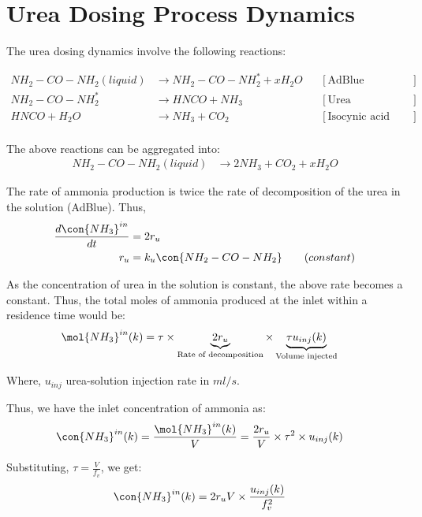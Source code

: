 \newpage
\section{Urea Dosing Process Dynamics}
The urea dosing dynamics involve the following reactions:

\begin{align*}
    NH_2 - CO - NH_2 (liquid) &\longrightarrow NH_2 - CO - NH_2^* + x H_2 O
                & &[\text{AdBlue evaporation}] \\
    NH_2 - CO - NH_2^*  &\longrightarrow  HNCO + NH_3
                & &[\text{Urea decomposition}] \\
    HNCO + H_2O &\longrightarrow NH_3 + CO_2
                & &[\text{Isocynic acid hydrolysis}] \\
\end{align*}

The above reactions can be aggregated into:
\begin{align*}
    NH_2 - CO - NH_2 (liquid) &\longrightarrow 2 NH_3 + CO_2 + x H_2 O
\end{align*}

The rate of ammonia production is twice the rate of decomposition of the urea in
the solution (AdBlue). Thus,
\begin{align*}
    \frac{d \con{NH_3}^{in}}{dt} &= 2 r_{u}\\
    r_{u} &= k_{u} \con{NH_2 - CO - NH_2} \qquad (constant)
\end{align*}

As the concentration of urea in the solution is constant, the above rate becomes
a constant. Thus, the total moles of ammonia produced at the inlet within a
residence time would be:
\begin{align*}
    \mol{NH_3}^{in} (k) &= \tau \times \underbrace{2 r_{u}}_{\text{Rate of decomposition}} \times \underbrace{\tau u_{inj} (k)}_{\text{Volume injected}}
\end{align*}

Where, $u_{inj}$ urea-solution injection rate in $ml/s$.

Thus, we have the inlet concentration of ammonia as:
\begin{align*}
    \con{NH_3}^{in} (k) &= \frac{\mol{NH_3}^{in} (k)}{V}
                          = \frac{2 r_u}{V} \times \tau^2 \times u_{inj} (k)
\end{align*}

Substituting, $\tau = \frac{V}{f_v}$, we get:
\begin{align}
    \con{NH_3}^{in} (k) &= 2r_u V \times \frac{u_{inj}(k)}{f_v^2}
\end{align}
